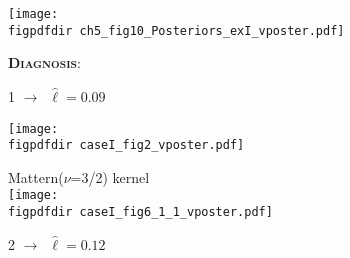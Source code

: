 \documentclass[portrait,a1,final]{a0poster} %
\let\tempone\itemize
\let\temptwo\enditemize
\renewenvironment{itemize}{\tempone\addtolength{\itemsep}{-0.3\baselineskip}}{\temptwo}
\def\figpdfdir{fig/} %
\begin{document}
\begin{minipage}{1\linewidth}
\begin{minipage}[t]{0.48\textwidth}
\begin{minipage}{0.33\textwidth}
\begin{itemize}
\item {}
\end{itemize}

\end{minipage}
\begin{minipage}{0.67\textwidth}
\centering
\texttt{[image: \\figpdfdir ch5\_fig10\_Posteriors\_exI\_vposter.pdf]}
\end{minipage}

\vspace{6mm}
\hspace{-7mm} \textsc{\textbf{\small Diagnosis}}:\\[-4mm]

\begin{minipage}[t]{0.49\textwidth}

\begin{minipage}[t]{0.45\textwidth}
{\large 1}\hspace{0.7cm}  $\to$\, {\scriptsize$\hat{\ell}=0.09$}

\vspace{0.3cm}
\texttt{[image: \\figpdfdir caseI\_fig2\_vposter.pdf]}

\end{minipage}
\begin{minipage}[t]{0.50\textwidth}
\vspace{-0.5cm}
\hspace{0.25\textwidth}  \tiny Mattern($\nu$=3/2) kernel\\
\texttt{[image: \\figpdfdir caseI\_fig6\_1\_1\_vposter.pdf]}

\end{minipage}

\end{minipage}
\begin{minipage}[t]{0.49\textwidth}

\begin{minipage}[t]{0.45\textwidth}
{\large 2}\hspace{0.7cm}  $\to$\, {\scriptsize$\hat{\ell}=0.12$}


\end{minipage}
\end{minipage}
\end{minipage}
\end{minipage}
\end{document}
